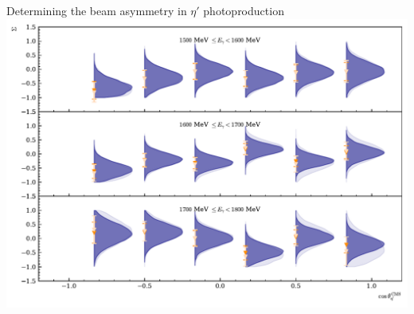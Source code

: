 \documentclass[11pt,aspectratio=169,dvipsnames]{beamer}
\begin{document}
	
	\begin{frame}{Determining the beam asymmetry in $\eta'$ photoproduction}
		\centering
		\includegraphics[width=.8\linewidth]{../../bayes/etap_event_based_fit/plots/sigma_etap_talk.pdf}
	\end{frame}
	
	
	
	
	
\end{document}
